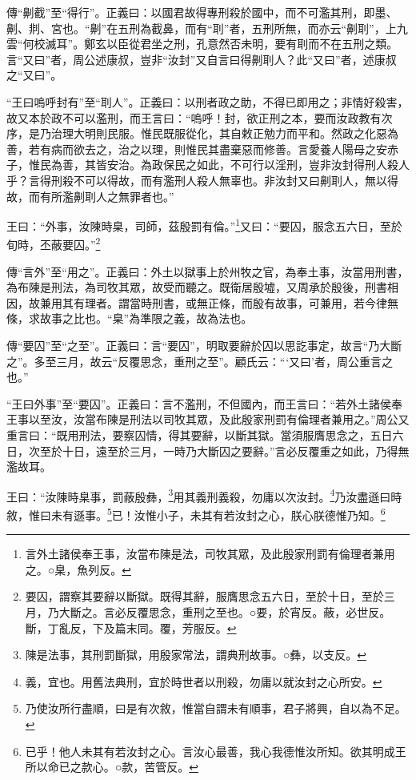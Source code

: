 {\noindent\zhuan{}\fzbyks 傳“劓截”至“得行”。正義曰：以國君故得專刑殺於國中，而不可濫其刑，即墨、劓、剕、宮也。“劓”在五刑為截鼻，而有“刵”者，五刑所無，而亦云“劓刵”，上九雲“何校滅耳”。鄭玄以臣從君坐之刑，孔意然否未明，要有刵而不在五刑之類。言“又曰”者，周公述康叔，豈非“汝封”又自言曰得劓刵人？此“又曰”者，述康叔之“又曰”。 \par}

{\noindent\shu{}\fzkt “王曰嗚呼封有”至“刵人”。正義曰：以刑者政之助，不得已即用之；非情好殺害，故又本於政不可以濫刑，而王言曰：“嗚呼！封，欲正刑之本，要而汝政教有次序，是乃治理大明則民服。惟民既服從化，其自敕正勉力而平和。然政之化惡為善，若有病而欲去之，治之以理，則惟民其盡棄惡而修善。言愛養人陽母之安赤子，惟民為善，其皆安治。為政保民之如此，不可行以淫刑，豈非汝封得刑人殺人乎？言得刑殺不可以得故，而有濫刑人殺人無辜也。非汝封又曰劓刵人，無以得故，而有所濫劓刵人之無罪者也。” \par}

王曰：“外事，汝陳時臬，司師，茲殷罰有倫。”\footnote{言外土諸侯奉王事，汝當布陳是法，司牧其眾，及此殷家刑罰有倫理者兼用之。○臬，魚列反。}又曰：“要囚，服念五六日，至於旬時，丕蔽要囚。”\footnote{要囚，謂察其要辭以斷獄。既得其辭，服膺思念五六日，至於十日，至於三月，乃大斷之。言必反覆思念，重刑之至也。○要，於宵反。蔽，必世反。斷，丁亂反，下及篇末同。覆，芳服反。}


{\noindent\zhuan{}\fzbyks 傳“言外”至“用之”。正義曰：外土以獄事上於州牧之官，為奉土事，汝當用刑書，為布陳是刑法，為司牧其眾，故受而聽之。既衛居殷墟，又周承於殷後，刑書相因，故兼用其有理者。謂當時刑書，或無正條，而殷有故事，可兼用，若今律無條，求故事之比也。“臬”為準限之義，故為法也。 \par}

{\noindent\zhuan{}\fzbyks 傳“要囚”至“之至”。正義曰：言“要囚”，明取要辭於囚以思訖事定，故言“乃大斷之”。多至三月，故云“反覆思念，重刑之至”。顧氏云：“‘又曰’者，周公重言之也。” \par}

{\noindent\shu{}\fzkt “王曰外事”至“要囚”。正義曰：言不濫刑，不但國內，而王言曰：“若外土諸侯奉王事以至汝，汝當布陳是刑法以司牧其眾，及此殷家刑罰有倫理者兼用之。”周公又重言曰：“既用刑法，要察囚情，得其要辭，以斷其獄。當須服膺思念之，五日六日，次至於十日，遠至於三月，一時乃大斷囚之要辭。”言必反覆重之如此，乃得無濫故耳。 \par}

王曰：“汝陳時臬事，罰蔽殷彝，\footnote{陳是法事，其刑罰斷獄，用殷家常法，謂典刑故事。○彝，以支反。}用其義刑義殺，勿庸以次汝封。\footnote{義，宜也。用舊法典刑，宜於時世者以刑殺，勿庸以就汝封之心所安。}乃汝盡遜曰時敘，惟曰未有遜事。\footnote{乃使汝所行盡順，曰是有次敘，惟當自謂未有順事，君子將興，自以為不足。}已！汝惟小子，未其有若汝封之心，朕心朕德惟乃知。\footnote{已乎！他人未其有若汝封之心。言汝心最善，我心我德惟汝所知。欲其明成王所以命已之款心。○款，苦管反。}


